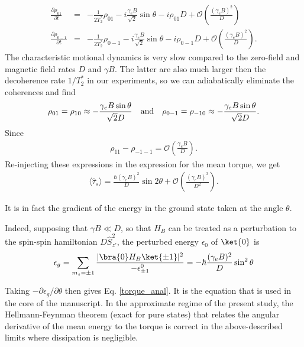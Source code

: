 \documentclass[preprintnumbers,amsmath,amssymb,onecolumn,12pt]{revtex4}
\newcommand{\bea}{\begin{eqnarray}}
\newcommand{\eea}{\end{eqnarray}}
\begin{document}
\bea
\frac{\partial \rho_{01}}{\partial t}&=&-\frac{1}{2T_2^*} \rho_{01}-i\frac{ \gamma_e B}{\sqrt{2}}\sin\theta-i\rho_{01}D+\mathcal{O}(\frac{(\gamma_e B)^2}{D})\\
\frac{\partial \rho_{0-1}}{\partial t}&=&-\frac{1}{2T_2^*}  \rho_{0-1}-i\frac{ \gamma_e B}{\sqrt{2}}\sin\theta-i\rho_{0-1}D+\mathcal{O}(\frac{(\gamma_e B)^2}{D}).
\eea
The characteristic motional dynamics is very slow compared to the zero-field and magnetic field rates $D$ and $\gamma B$. The latter are also much larger then the decoherence rate $1/T_2^*$ in our experiments, so we can adiabatically eliminate the coherences and find 
\bea
\rho_{01}=\rho_{10}\approx-\frac{\gamma_e B \sin\theta}{\sqrt{2} D} \quad {\rm and} \quad \rho_{0-1}=\rho_{-10}\approx-\frac{\gamma_e B \sin\theta}{\sqrt{2} D}.\eea
Since 
\bea
\rho_{11}-\rho_{-1-1}=\mathcal{O}(\frac{\gamma_e B}{D}).
\eea 
Re-injecting these expressions in the expression for the mean torque, we get 
\bea
\langle \hat \tau_s \rangle = \frac{\hbar(\gamma_e B)^2}{D}\sin2\theta
 +  \mathcal{O}(\frac{(\gamma_e B)^3}{D^2}).\label{torque_anal}
\eea

It is in fact the gradient of the energy in the ground state taken at the angle $\theta$. 

Indeed, supposing that $\gamma B \ll D$, so that $H_{B}$ can be treated as a perturbation to the spin-spin hamiltonian $D \hat S_{z'}^2$, 
the perturbed energy $\epsilon_0$ of $\ket{0}$ is 
\bea \epsilon_g=\sum_{m_s=\pm 1}\frac{ |\bra{0} H_B \ket{\pm 1}|^2}{-\epsilon^0_{\pm 1}}=-\hbar\frac{(\gamma_e B)^2 }{D} \sin^2\theta
\eea

Taking $ -\partial \epsilon_g /\partial \theta$ then gives Eq. \ref{torque_anal}. It is the equation that is used in the core of the manuscript. 
In the approximate regime of the present study, the Hellmann-Feynman theorem (exact for pure states) that relates the angular derivative of the mean energy to the torque is correct in the above-described limits where dissipation is negligible. \\
\end{document}

